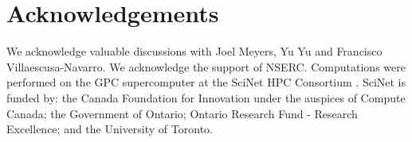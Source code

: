 
\section*{\centering Acknowledgements}

We acknowledge valuable discussions with Joel Meyers, Yu Yu and Francisco Villaescusa-Navarro.  We acknowledge the support of NSERC. Computations were performed on the GPC supercomputer at the SciNet HPC Consortium \citep{loken/etal:2010}. SciNet is funded by: the Canada Foundation for Innovation under the auspices of Compute Canada; the Government of Ontario; Ontario Research Fund - Research Excellence; and the University of Toronto.
  
